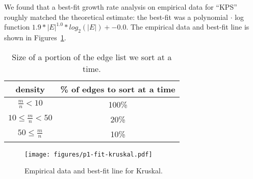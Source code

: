 We found that a best-fit growth rate analysis on empirical data for ``KPS''
roughly matched the theoretical estimate: the best-fit was a polynomial $\cdot$
log function $1.9 * |E|^{1.0} * log_2(|E|) + -0.0$.  The empirical data and
best-fit line is shown in Figures~\ref{fig:p1-fit-kruskal}.

\begin{table}
\begin{tabular}{|c|c|}
\hline
density&\% of edges to sort at a time\\
\hline
$\frac{m}{n} < 10$& 100\% \\
$10 \leq \frac{m}{n} < 50$& 20\% \\
$50 \leq \frac{m}{n}$& 10\% \\
\hline
\end{tabular}
\caption{Size of a portion of the edge list we sort at a time.}
\label{table:kruskal-sort-percent}
\end{table}

\begin{figure}[htb]
\centering
\texttt{[image: figures/p1-fit-kruskal.pdf]}
\caption{Empirical data and best-fit line for Kruskal.}
\label{fig:p1-fit-kruskal}
\end{figure}
